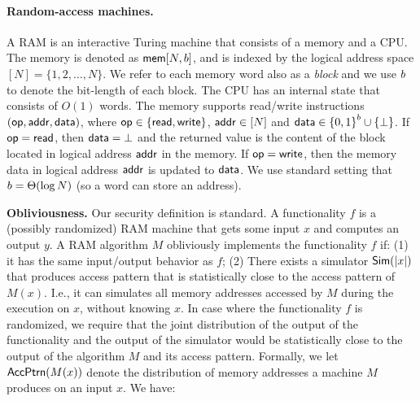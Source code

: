 \paragraph{Random-access machines.}
A RAM is an interactive Turing machine that consists of a memory and a CPU.  The
memory is denoted as ${\mathsf{mem}}[{N},{b}]$, and is indexed by the logical
address space $[N] = \{1,2,\ldots,N\}$. We refer to each memory word also as a
\emph{block} and we use $b$ to denote the bit-length of each block. The CPU
has an internal state that consists of $O(1)$ words. The memory supports read/write
instructions $(\mathsf{op},{\mathsf{addr}}, {\mathsf{data}})$, where $\mathsf{op} \in \{{\mathsf{read}},{\mathsf{write}}\}$, ${\mathsf{addr}} \in
[N]$ and ${\mathsf{data}} \in {\{0,1\}}^{b} \cup \{\bot\}$.  If $\mathsf{op} = {\mathsf{read}}$, then
${\mathsf{data}}=\bot$ and the returned value is the content of the block located in
logical address ${\mathsf{addr}}$ in the memory. If $\mathsf{op}={\mathsf{write}}$, then the memory data in
logical address ${\mathsf{addr}}$ is updated to ${\mathsf{data}}$.
We use standard setting that ${b} = \Theta(\log N)$ (so a word can 
store an address).

\medskip
\noindent
{\bf Obliviousness.}
Our security definition is standard. A functionality $f$ is a (possibly randomized) RAM machine that gets some input $x$ and computes an output $y$. A RAM algorithm $M$ obliviously implements the functionality $f$ if: (1) it has the same input/output behavior as $f$; (2) There exists a simulator ${\sf Sim}(\lvert x\rvert)$ that produces access pattern that is statistically close to the access pattern of $M(x)$. I.e., it can simulates all memory addresses accessed by $M$ during the execution on $x$, without knowing $x$. In case where the functionality $f$ is randomized, we require that the joint distribution of the output of the functionality and the output of the simulator would be statistically close to the output of the algorithm $M$ and its access pattern. Formally, we let ${\sf AccPtrn}(M(x))$ denote the distribution of memory addresses a machine $M$ produces on an input $x$. We have:

